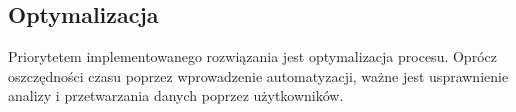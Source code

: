 \subsection{Optymalizacja}
Priorytetem implementowanego rozwiązania jest optymalizacja procesu. Oprócz oszczędności czasu poprzez wprowadzenie automatyzacji, ważne jest usprawnienie analizy i przetwarzania danych poprzez użytkowników.